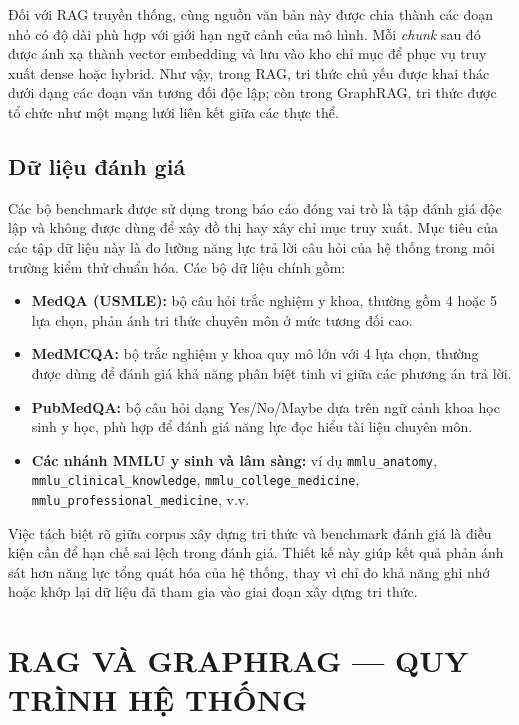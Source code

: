 \documentclass[a4paper,12pt,twoside]{report}
\begin{document}
Đối với RAG truyền thống, cùng nguồn văn bản này được chia thành các đoạn nhỏ có độ dài phù hợp với giới hạn ngữ cảnh của mô hình. Mỗi \textit{chunk} sau đó được ánh xạ thành vector embedding và lưu vào kho chỉ mục để phục vụ truy xuất dense hoặc hybrid. Như vậy, trong RAG, tri thức chủ yếu được khai thác dưới dạng các đoạn văn tương đối độc lập; còn trong GraphRAG, tri thức được tổ chức như một mạng lưới liên kết giữa các thực thể.

\section{Dữ liệu đánh giá}
Các bộ benchmark được sử dụng trong báo cáo đóng vai trò là tập đánh giá độc lập và không được dùng để xây đồ thị hay xây chỉ mục truy xuất. Mục tiêu của các tập dữ liệu này là đo lường năng lực trả lời câu hỏi của hệ thống trong môi trường kiểm thử chuẩn hóa. Các bộ dữ liệu chính gồm:
\begin{itemize}[nosep]
  \item \textbf{MedQA (USMLE):} bộ câu hỏi trắc nghiệm y khoa, thường gồm 4 hoặc 5 lựa chọn, phản ánh tri thức chuyên môn ở mức tương đối cao.
  \item \textbf{MedMCQA:} bộ trắc nghiệm y khoa quy mô lớn với 4 lựa chọn, thường được dùng để đánh giá khả năng phân biệt tinh vi giữa các phương án trả lời.
  \item \textbf{PubMedQA:} bộ câu hỏi dạng Yes/No/Maybe dựa trên ngữ cảnh khoa học sinh y học, phù hợp để đánh giá năng lực đọc hiểu tài liệu chuyên môn.
  \item \textbf{Các nhánh MMLU y sinh và lâm sàng:} ví dụ \texttt{mmlu\_anatomy}, \texttt{mmlu\_clinical\_knowledge}, \texttt{mmlu\_college\_medicine}, \texttt{mmlu\_professional\_medicine}, v.v.
\end{itemize}

Việc tách biệt rõ giữa corpus xây dựng tri thức và benchmark đánh giá là điều kiện cần để hạn chế sai lệch trong đánh giá. Thiết kế này giúp kết quả phản ánh sát hơn năng lực tổng quát hóa của hệ thống, thay vì chỉ đo khả năng ghi nhớ hoặc khớp lại dữ liệu đã tham gia vào giai đoạn xây dựng tri thức.

\chapter{RAG VÀ GRAPHRAG --- QUY TRÌNH HỆ THỐNG}
\label{chap:workflow}
\end{document}
